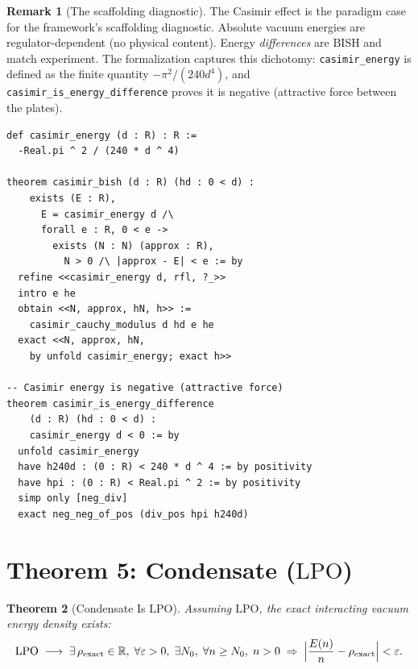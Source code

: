 \documentclass[11pt,a4paper]{article}
\theoremstyle{plain}
\newtheorem{theorem}{Theorem}[section]
\theoremstyle{definition}
\newtheorem{remark}[theorem]{Remark}
\newcommand{\RR}{\mathbb{R}}
\newcommand{\LPO}{\ensuremath{\mathrm{LPO}}}
\newcommand{\BISH}{\ensuremath{\mathrm{BISH}}}
\begin{document}
\begin{remark}[The scaffolding diagnostic]
The Casimir effect is the paradigm case for the framework's
scaffolding diagnostic.  Absolute vacuum energies
are regulator-dependent (no physical content).
Energy \emph{differences} are $\BISH$ and match experiment.
The formalization captures this dichotomy: \texttt{casimir\_energy}
is defined as the finite quantity $-\pi^2/(240d^4)$, and
\texttt{casimir\_is\_energy\_difference} proves it is negative
(attractive force between the plates).
\end{remark}

\begin{lstlisting}[caption={Casimir energy: \texttt{CasimirBISH.lean}}]
def casimir_energy (d : R) : R :=
  -Real.pi ^ 2 / (240 * d ^ 4)

theorem casimir_bish (d : R) (hd : 0 < d) :
    exists (E : R),
      E = casimir_energy d /\
      forall e : R, 0 < e ->
        exists (N : N) (approx : R),
          N > 0 /\ |approx - E| < e := by
  refine <<casimir_energy d, rfl, ?_>>
  intro e he
  obtain <<N, approx, hN, h>> :=
    casimir_cauchy_modulus d hd e he
  exact <<N, approx, hN,
    by unfold casimir_energy; exact h>>

-- Casimir energy is negative (attractive force)
theorem casimir_is_energy_difference
    (d : R) (hd : 0 < d) :
    casimir_energy d < 0 := by
  unfold casimir_energy
  have h240d : (0 : R) < 240 * d ^ 4 := by positivity
  have hpi : (0 : R) < Real.pi ^ 2 := by positivity
  simp only [neg_div]
  exact neg_neg_of_pos (div_pos hpi h240d)
\end{lstlisting}

\section{Theorem 5: Condensate ($\LPO$)}\label{sec:condensate}

\begin{theorem}[Condensate Is $\LPO$]\label{thm:condensate}
Assuming $\LPO$, the exact interacting vacuum energy density exists:
\[
  \LPO \;\longrightarrow\; \exists\, \rho_{\mathrm{exact}} \in \RR,\;
  \forall \varepsilon > 0,\; \exists N_0,\; \forall n \geq N_0,\;
  n > 0 \;\Rightarrow\;
  \Bigl|\frac{E(n)}{n} - \rho_{\mathrm{exact}}\Bigr| < \varepsilon.
\]
\end{theorem}
\end{document}
